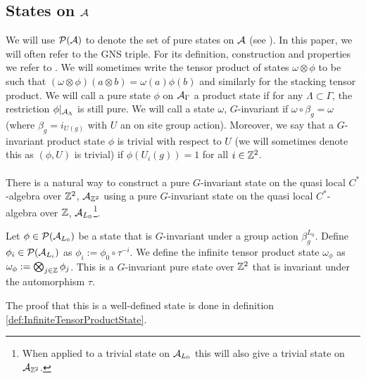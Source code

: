 \documentclass[11pt,a4paper,twoside]{article}
\numberwithin{equation}{section}
\begin{document}
	\subsection{States on \texorpdfstring{$\AA$}{}}\label{sec:States}
	We will use $\PP(\AA)$ to denote the set of pure states on $\AA$ (see \cite{bratteli1979operator}). In this paper, we will often refer to the GNS triple. For its definition, construction and properties we refer to \cite{bratteli1979operator}. We will sometimes write the tensor product of states $\omega\otimes\phi$ to be such that $(\omega\otimes\phi)(a\otimes b)=\omega(a)\phi(b)$ and similarly for the stacking tensor product. We will call a pure state $\phi$ on $\AA_\Gamma$ a product state if for any $\Lambda\subset\Gamma$, the restriction $\phi|_{\AA_\Lambda}$ is still pure. We will call a state $\omega$, $G$-invariant if $\omega\circ\beta_g=\omega$ (where $\beta_g=i_{U(g)}$ with $U$ an on site group action). Moreover, we say that a $G$-invariant product state $\phi$ is trivial with respect to $U$ (we will sometimes denote this as $(\phi,U)$ is trivial) if $\phi(U_i(g))=1$ for all $i\in\ZZ^2$.\\\\
	There is a natural way to construct a pure $G$-invariant state on the quasi local $C^*$-algebra over $\ZZ^2$, $\AA_{\ZZ^2}$ using a pure $G$-invariant state on the quasi local $C^*$-algebra over $\ZZ$, $\AA_{L_0}$\footnote{When applied to a trivial state on $\AA_{L_0}$ this will also give a trivial state on $\AA_{\ZZ^2}$.}.
	\begin{definition}\label{def:InfiniteTensorProduct}
		Let $\phi\in\PP(\AA_{L_0})$ be a state that is $G$-invariant under a group action $\beta_g^{L_0}$. Define $\phi_i\in\PP(\AA_{L_i})$ as $\phi_i:=\phi_0\circ\tau^{-i}$. We define the infinite tensor product state $\omega_\phi$ as $\omega_\phi:=\bigotimes_{j\in\ZZ}\phi_j$. This is a $G$-invariant pure state over $\ZZ^2$ that is invariant under the automorphism $\tau$.
	\end{definition}
	The proof that this is a well-defined state is done in definition \ref{def:InfiniteTensorProductState}.
\end{document}
